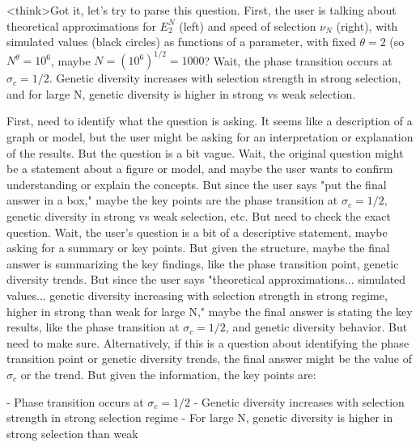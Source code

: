 <think>Got it, let's try to parse this question. First, the user is talking about theoretical approximations for \( E^N_2 \) (left) and speed of selection \( \nu_N \) (right), with simulated values (black circles) as functions of a parameter, with fixed \( \theta = 2 \) (so \( N^\theta = 10^6 \), maybe \( N = (10^6)^{1/2} = 1000 \)? Wait, the phase transition occurs at \( \sigma_c = 1/2 \). Genetic diversity increases with selection strength in strong selection, and for large N, genetic diversity is higher in strong vs weak selection.

First, need to identify what the question is asking. It seems like a description of a graph or model, but the user might be asking for an interpretation or explanation of the results. But the question is a bit vague. Wait, the original question might be a statement about a figure or model, and maybe the user wants to confirm understanding or explain the concepts. But since the user says "put the final answer in a box," maybe the key points are the phase transition at \( \sigma_c = 1/2 \), genetic diversity in strong vs weak selection, etc. But need to check the exact question. Wait, the user's question is a bit of a descriptive statement, maybe asking for a summary or key points. But given the structure, maybe the final answer is summarizing the key findings, like the phase transition point, genetic diversity trends. But since the user says "theoretical approximations... simulated values... genetic diversity increasing with selection strength in strong regime, higher in strong than weak for large N," maybe the final answer is stating the key results, like the phase transition at \( \sigma_c = 1/2 \), and genetic diversity behavior. But need to make sure. Alternatively, if this is a question about identifying the phase transition point or genetic diversity trends, the final answer might be the value of \( \sigma_c \) or the trend. But given the information, the key points are:

- Phase transition occurs at \( \sigma_c = 1/2 \)
- Genetic diversity increases with selection strength in strong selection regime
- For large N, genetic diversity is higher in strong selection than weak

